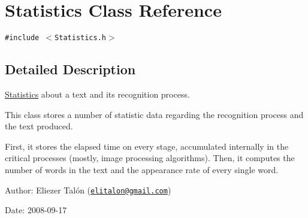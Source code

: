 \hypertarget{class_statistics}{
\section{Statistics Class Reference}
\label{class_statistics}
}
{\tt \#include $<$Statistics.h$>$}



\subsection{Detailed Description}
\hyperlink{class_statistics}{Statistics} about a text and its recognition process. 

This class stores a number of statistic data regarding the recognition process and the text produced.

First, it stores the elapsed time on every stage, accumulated internally in the critical processes (mostly, image processing algorithms). Then, it computes the number of words in the text and the appearance rate of every single word.

\begin{Desc}
\item[Author:]Eliezer Talón (\href{mailto:elitalon@gmail.com}{\tt elitalon@gmail.com}) \end{Desc}
\begin{Desc}
\item[Date:]2008-09-17 \end{Desc}


